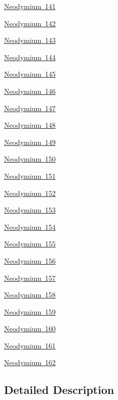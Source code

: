 \begin{DoxyCompactItemize}
\item 
\mbox{\hyperlink{group___isotope_const-_neodymium-_nd141}{Neodymium 141}}
\item 
\mbox{\hyperlink{group___isotope_const-_neodymium-_nd142}{Neodymium 142}}
\item 
\mbox{\hyperlink{group___isotope_const-_neodymium-_nd143}{Neodymium 143}}
\item 
\mbox{\hyperlink{group___isotope_const-_neodymium-_nd144}{Neodymium 144}}
\item 
\mbox{\hyperlink{group___isotope_const-_neodymium-_nd145}{Neodymium 145}}
\item 
\mbox{\hyperlink{group___isotope_const-_neodymium-_nd146}{Neodymium 146}}
\item 
\mbox{\hyperlink{group___isotope_const-_neodymium-_nd147}{Neodymium 147}}
\item 
\mbox{\hyperlink{group___isotope_const-_neodymium-_nd148}{Neodymium 148}}
\item 
\mbox{\hyperlink{group___isotope_const-_neodymium-_nd149}{Neodymium 149}}
\item 
\mbox{\hyperlink{group___isotope_const-_neodymium-_nd150}{Neodymium 150}}
\item 
\mbox{\hyperlink{group___isotope_const-_neodymium-_nd151}{Neodymium 151}}
\item 
\mbox{\hyperlink{group___isotope_const-_neodymium-_nd152}{Neodymium 152}}
\item 
\mbox{\hyperlink{group___isotope_const-_neodymium-_nd153}{Neodymium 153}}
\item 
\mbox{\hyperlink{group___isotope_const-_neodymium-_nd154}{Neodymium 154}}
\item 
\mbox{\hyperlink{group___isotope_const-_neodymium-_nd155}{Neodymium 155}}
\item 
\mbox{\hyperlink{group___isotope_const-_neodymium-_nd156}{Neodymium 156}}
\item 
\mbox{\hyperlink{group___isotope_const-_neodymium-_nd157}{Neodymium 157}}
\item 
\mbox{\hyperlink{group___isotope_const-_neodymium-_nd158}{Neodymium 158}}
\item 
\mbox{\hyperlink{group___isotope_const-_neodymium-_nd159}{Neodymium 159}}
\item 
\mbox{\hyperlink{group___isotope_const-_neodymium-_nd160}{Neodymium 160}}
\item 
\mbox{\hyperlink{group___isotope_const-_neodymium-_nd161}{Neodymium 161}}
\item 
\mbox{\hyperlink{group___isotope_const-_neodymium-_nd162}{Neodymium 162}}
\end{DoxyCompactItemize}


\subsection{Detailed Description}
